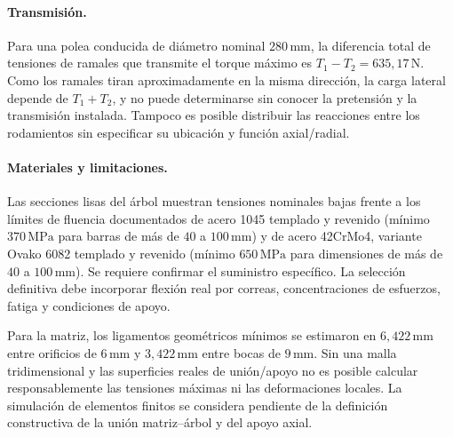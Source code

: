 \paragraph{Transmisión.} Para una polea conducida de diámetro nominal $280\,\mathrm{mm}$, la diferencia total de tensiones de ramales que transmite el torque máximo es $T_1-T_2=635{,}17\,\mathrm{N}$. Como los ramales tiran aproximadamente en la misma dirección, la carga lateral depende de $T_1+T_2$, y no puede determinarse sin conocer la pretensión y la transmisión instalada. Tampoco es posible distribuir las reacciones entre los rodamientos sin especificar su ubicación y función axial/radial.

\paragraph{Materiales y limitaciones.} Las secciones lisas del árbol muestran tensiones nominales bajas frente a los límites de fluencia documentados de acero 1045 templado y revenido (mínimo $370\,\mathrm{MPa}$ para barras de más de $40$ a $100\,\mathrm{mm}$) y de acero 42CrMo4, variante Ovako 6082 templado y revenido (mínimo $650\,\mathrm{MPa}$ para dimensiones de más de $40$ a $100\,\mathrm{mm}$). Se requiere confirmar el suministro específico. La selección definitiva debe incorporar flexión real por correas, concentraciones de esfuerzos, fatiga y condiciones de apoyo.

Para la matriz, los ligamentos geométricos mínimos se estimaron en $6{,}422\,\mathrm{mm}$ entre orificios de $6\,\mathrm{mm}$ y $3{,}422\,\mathrm{mm}$ entre bocas de $9\,\mathrm{mm}$. Sin una malla tridimensional y las superficies reales de unión/apoyo no es posible calcular responsablemente las tensiones máximas ni las deformaciones locales. La simulación de elementos finitos se considera pendiente de la definición constructiva de la unión matriz--árbol y del apoyo axial.
